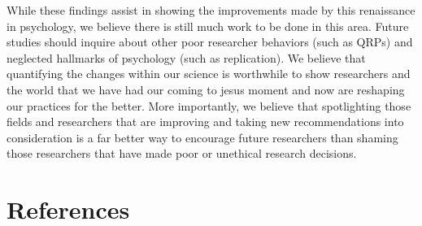 \documentclass[english,man]{apa6}
\theoremstyle{definition}
\theoremstyle{definition}
\theoremstyle{definition}
\theoremstyle{remark}
\begin{document}
While these findings assist in showing the improvements made by this
renaissance in psychology, we believe there is still much work to be
done in this area. Future studies should inquire about other poor
researcher behaviors (such as QRPs) and neglected hallmarks of
psychology (such as replication). We believe that quantifying the
changes within our science is worthwhile to show researchers and the
world that we have had our coming to jesus moment and now are reshaping
our practices for the better. More importantly, we believe that
spotlighting those fields and researchers that are improving and taking
new recommendations into consideration is a far better way to encourage
future researchers than shaming those researchers that have made poor or
unethical research decisions.

\newpage

\section{References}\label{references}

\setlength{\parindent}{-0.5in} \setlength{\leftskip}{0.5in}
\end{document}
